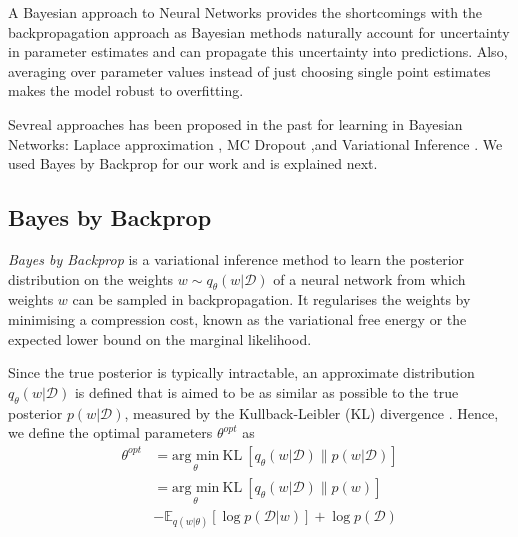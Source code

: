 A Bayesian approach to Neural Networks provides the shortcomings with the backpropagation approach \cite{mackay1996hyperparameters} as Bayesian methods naturally account for uncertainty in parameter estimates and can propagate this uncertainty into predictions.
Also, averaging over parameter values instead of just choosing single point estimates makes the model robust to overfitting. 

Sevreal approaches has been proposed in the past for learning in Bayesian Networks: Laplace approximation \cite{Mackay1991APB}, MC Dropout \cite{gal2015bayesian},and Variational Inference \cite{hinton1993keeping} \cite{graves2011practical} \cite{blundell2015weight}. We used Bayes by Backprop \cite{blundell2015weight} for our work and is explained next.

\subsection{Bayes by Backprop}
\textit{Bayes by Backprop} \cite{graves2011practical, blundell2015weight} is a variational inference method to learn the posterior distribution on the weights $w \sim q_{\theta}(w|\mathcal{D})$ of a neural network from which weights $w$ can be sampled in backpropagation. 
It regularises the weights by minimising a compression cost, known as the variational free energy or the expected lower bound on the marginal likelihood.

Since the true posterior is typically intractable, an approximate distribution $q_{\theta}(w|\mathcal{D})$ is defined that is aimed to be as similar as possible to the true posterior $p(w|\mathcal{D})$, measured by the Kullback-Leibler (KL) divergence \cite{kullback1951information}. Hence, we define the optimal parameters $\theta^{opt}$ as
\begin{equation}
    \begin{aligned} \label{KL}
        \theta^{opt}&=\underset{\theta}{\text{arg min}}\ \text{KL} \ [q_{\theta}(w|\mathcal{D})\|p(w|\mathcal{D})] \\
        &=\underset{\theta}{\text{arg min}}\ \text{KL} \ [q_{\theta}(w|\mathcal{D})\|p(w)] \\ & -\mathbb{E}_{q(w|\theta)}[\log p(\mathcal{D}|w)]+\log p(\mathcal{D})
    \end{aligned}
\end{equation}


